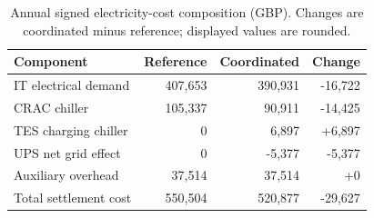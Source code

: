 \begin{table}[htbp]
\centering\small
\caption{Annual signed electricity-cost composition (GBP). Changes are coordinated minus reference; displayed values are rounded.}\label{tab:cost-components}
\begin{tabular}{@{}lrrr@{}}\toprule
Component & Reference & Coordinated & Change \\\midrule
IT electrical demand & 407,653 & 390,931 & -16,722 \\
CRAC chiller & 105,337 & 90,911 & -14,425 \\
TES charging chiller & 0 & 6,897 & +6,897 \\
UPS net grid effect & 0 & -5,377 & -5,377 \\
Auxiliary overhead & 37,514 & 37,514 & +0 \\
Total settlement cost & 550,504 & 520,877 & -29,627 \\
\bottomrule\end{tabular}
\end{table}
